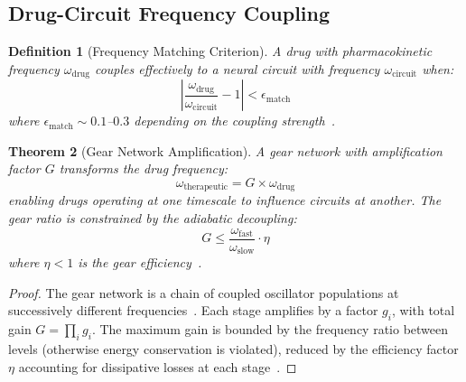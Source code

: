 \documentclass[10pt,twocolumn]{article}
\newtheorem{theorem}{Theorem}[section]
\newtheorem{definition}[theorem]{Definition}
\theoremstyle{remark}
\begin{document}
\subsection{Drug-Circuit Frequency Coupling}

\begin{definition}[Frequency Matching Criterion]
\label{def:freq_match}
A drug with pharmacokinetic frequency $\omega_{\mathrm{drug}}$ couples effectively to a neural circuit with frequency $\omega_{\mathrm{circuit}}$ when:
\begin{equation}
\left| \frac{\omega_{\mathrm{drug}}}{\omega_{\mathrm{circuit}}} - 1 \right| < \epsilon_{\mathrm{match}}
\end{equation}
where $\epsilon_{\mathrm{match}} \sim 0.1$--$0.3$ depending on the coupling strength~\cite{kuramoto1984chemical}.
\end{definition}

\begin{theorem}[Gear Network Amplification]
\label{thm:gear}
A gear network with amplification factor $G$ transforms the drug frequency:
\begin{equation}
\omega_{\mathrm{therapeutic}} = G \times \omega_{\mathrm{drug}}
\end{equation}
enabling drugs operating at one timescale to influence circuits at another. The gear ratio is constrained by the adiabatic decoupling:
\begin{equation}
G \leq \frac{\omega_{\mathrm{fast}}}{\omega_{\mathrm{slow}}} \cdot \eta
\end{equation}
where $\eta < 1$ is the gear efficiency~\cite{nicholls2013bioenergetics}.
\end{theorem}

\begin{proof}
The gear network is a chain of coupled oscillator populations at successively different frequencies~\cite{buzsaki2006rhythms}. Each stage amplifies by a factor $g_i$, with total gain $G = \prod_i g_i$. The maximum gain is bounded by the frequency ratio between levels (otherwise energy conservation is violated), reduced by the efficiency factor $\eta$ accounting for dissipative losses at each stage~\cite{seifert2012stochastic}.
\end{proof}
\end{document}
